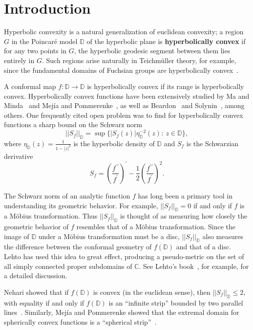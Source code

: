 \documentclass[12pt]{icgft}
\newcommand{\C}{\mathbb C}
\newcommand{\D}{\mathbb D}
\newcommand{\abs}[1]{\lvert#1\rvert}
\newcommand{\norm}[1]{\lvert\lvert#1\rvert\rvert}
\theoremstyle{definition}
\numberwithin{equation}{section}
\begin{document}

\section{Introduction}\label{S:intro}

Hyperbolic convexity is a natural generalization of euclidean
convexity; a region $G$ in the Poincar\'e model $\D$ of the hyperbolic
plane  is  \textbf{hyperbolically convex} if for any
two points in $G$, the hyperbolic geodesic segment between them lies entirely
in $G$.  Such regions arise naturally  in Teichm\"uller theory, for example, since
the fundamental domains of Fuchsian groups are hyperbolically convex~\cite{aB83,
oL87}.

A conformal map $f:\D\to\D$ is hyperbolically convex if
its range is hyperbolically convex.
Hyperbolically convex functions have been extensively studied  by Ma and
Minda~\cite{MM94,MM99} and Mej\'ia and Pommerenke~\cite{PM00,MP00,MP01,MP02,MP00b},
as well as Beardon~\cite{aB83} and Solynin~\cite{aS99,aS98},
 among
others.  One frequently cited open problem was to find
for hyperbolically convex functions a sharp bound
on the Schwarz norm
\[
\norm{S_f}_\D=\sup\{\abs{S_f(z)} \eta_\D^{-2}(z):\: z\in \D\},
\]
where $\eta_\D(z)=\frac{1}{1-\abs{z}^2}$
 is the hyperbolic density of $\D$ and $S_f$ is the Schwarzian derivative
\[
S_f = \left(\frac{f^{\prime\prime}}{f^\prime}\right)^\prime -
\frac{1}{2}\left(\frac{f^{\prime\prime}}{f^\prime}\right)^2.
\]


The Schwarz norm
of an analytic function $f$ has long been a primary tool in understanding
its geometric behavior.
For example,
$\norm{S_f}_\D =0$ if and only if $f$ is a M\"obius transformation.
Thus $\norm{S_f}_\D$ is thought of as measuring how closely the geometric
behavior of $f$ resembles that of a M\"obius transformation.
Since the image of $\D$ under a M\"obius transformation must be a disc,
$\norm{S_f}_\D$ also measures the difference between the conformal geometry
of $f(\D)$ and that of a disc.  Lehto has used this idea to great effect,
producing a pseudo-metric on the set of all simply connected proper
subdomains of $\C$.
See Lehto's book~\cite{oL87}, for example, for
a detailed discussion.

 Nehari showed that if $f(\D)$ is convex (in the euclidean sense),
then $\norm{S_f}_\D\leq 2$, with equality if and only if $f(\D)$ is an
``infinite strip'' bounded by two parallel lines~\cite{zN76}.
Similarly, Mej\'ia and Pommerenke showed that the extremal domain for spherically
convex functions is a ``spherical strip''~\cite{MP00b}.
\end{document}
